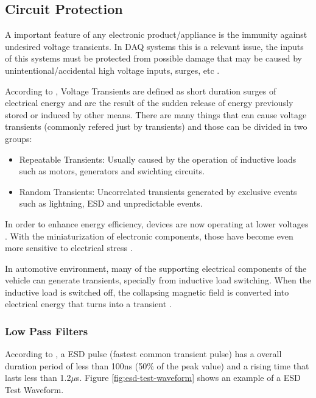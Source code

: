 \subsection{Circuit Protection}\label{ssec:circuitProtection}
	A important feature of any electronic product/appliance is the immunity against undesired voltage transients. In DAQ systems this is a relevant issue, the inputs of this systems must be protected from possible damage that may be caused by unintentional/accidental high voltage inputs, surges, etc \cite{mathivanan2007pc}.
	\par
	According to \cite{littlelFuseWhatIsTransientVoltage}, Voltage Transients are defined as short duration surges of electrical energy and are the result of the sudden release of energy previously stored or induced by other means. There are many things that can cause voltage transients (commonly refered just by transients) and those can be divided in two groups:

	\begin{itemize}
		\item Repeatable Transients: Usually caused by the operation of inductive loads such as motors, generators and swichting circuits.\label{itm:repeatable-transients}
		\item Random Transients: Uncorrelated transients generated by exclusive events such as lightning, ESD and unpredictable events.\label{itm:random-transients}
	\end{itemize}

	In order to enhance energy efficiency, devices are now operating at lower voltages \cite{xavier2017benefits}. With the miniaturization of electronic components, those have become even more sensitive to electrical stress \cite{littlelFuseWhatIsTransientVoltage}.
	\par
	In automotive environment, many of the supporting electrical components of the vehicle can generate transients, specially from inductive load switching. When the inductive load is switched off, the collapsing magnetic field is converted into electrical energy that turns into a transient \cite{littlelFuseWhatIsTransientVoltage}.

	\subsubsection{Low Pass Filters}\label{sssec:lowPassFilterTransientProtection}
		According to \cite{littlelFuseWhatIsTransientVoltage}, a ESD pulse (fastest common transient pulse) has a overall duration period of less than 100ns (50$\%$ of the peak value) and a rising time that lasts less than 1.2$\mu$s. Figure \ref{fig:esd-test-waveform} shows an example of a ESD Test Waveform.

